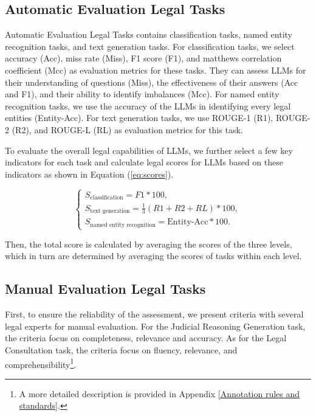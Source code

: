 \subsection{Automatic Evaluation Legal Tasks}
\label{sec:Automatic Evaluation Legal Tasks}
Automatic Evaluation Legal Tasks contains classification tasks, named entity recognition tasks, and text generation tasks.
For classification tasks, we select accuracy (Acc), miss rate (Miss), F1 score (F1), and matthews correlation coefficient (Mcc) as evaluation metrics for these tasks. They can assess LLMs for their understanding of questions (Miss), the effectiveness of their answers (Acc and F1), and their ability to identify imbalances (Mcc). 
For named entity recognition tasks, we use the accuracy of the LLMs in identifying every legal entities (Entity-Acc). 
For text generation tasks, we use ROUGE-1 (R1), ROUGE-2 (R2), and ROUGE-L (RL) as evaluation metrics for this task. 

To evaluate the overall legal capabilities of LLMs, we further select a few key indicators for each task and calculate legal scores for LLMs based on these indicators as shown in Equation (\ref{eq:scores}).

\begin{equation}
\begin{cases}
    S_{\text{classification}}=F1*100, \\
    S_{\text{text generation}}=\frac{1}{3}(R1+R2+RL)*100, \\
    S_{\text{named entity recognition}}=\text{Entity-Acc}*100.
\end{cases}
\label{eq:scores}
\end{equation}

Then, the total score is calculated by averaging the scores of the three levels, which in turn are determined by averaging the scores of tasks within each level.

\subsection{Manual Evaluation Legal Tasks}
\label{sec:Manual Evaluation Legal Tasks}
First, to ensure the reliability of the assessment, we present criteria with several legal experts for manual evaluation. For the Judicial Reasoning Generation task, the criteria focus on completeness, relevance and accuracy. As for the Legal Consultation task, the criteria focus on fluency, relevance, and comprehensibility\footnote{A more detailed description is provided in Appendix \ref{Annotation rules and standards}.}.

